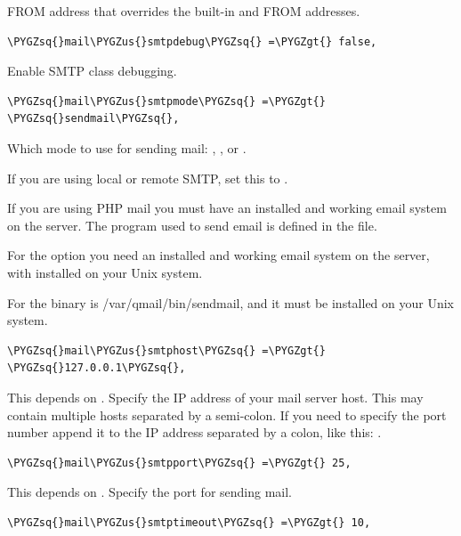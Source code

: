 \documentclass[letterpaper,10pt,english]{sphinxmanual}
\def\PYGZus{\char`\_}
\def\PYGZgt{\char`\>}
\def\PYGZsq{\char`\'}
\renewcommand\PYGZsq{\textquotesingle}
\begin{document}
FROM address that overrides the built-in  and
 FROM addresses.

\begin{Verbatim}[commandchars=\\\{\}]
\PYGZsq{}mail\PYGZus{}smtpdebug\PYGZsq{} =\PYGZgt{} false,
\end{Verbatim}

Enable SMTP class debugging.

\begin{Verbatim}[commandchars=\\\{\}]
\PYGZsq{}mail\PYGZus{}smtpmode\PYGZsq{} =\PYGZgt{} \PYGZsq{}sendmail\PYGZsq{},
\end{Verbatim}

Which mode to use for sending mail: , ,  or
.

If you are using local or remote SMTP, set this to .

If you are using PHP mail you must have an installed and working email system
on the server. The program used to send email is defined in the 
file.

For the  option you need an installed and working email system on
the server, with  installed on your Unix system.

For  the binary is /var/qmail/bin/sendmail, and it must be installed
on your Unix system.

\begin{Verbatim}[commandchars=\\\{\}]
\PYGZsq{}mail\PYGZus{}smtphost\PYGZsq{} =\PYGZgt{} \PYGZsq{}127.0.0.1\PYGZsq{},
\end{Verbatim}

This depends on . Specify the IP address of your mail
server host. This may contain multiple hosts separated by a semi-colon. If
you need to specify the port number append it to the IP address separated by
a colon, like this: .

\begin{Verbatim}[commandchars=\\\{\}]
\PYGZsq{}mail\PYGZus{}smtpport\PYGZsq{} =\PYGZgt{} 25,
\end{Verbatim}

This depends on . Specify the port for sending mail.

\begin{Verbatim}[commandchars=\\\{\}]
\PYGZsq{}mail\PYGZus{}smtptimeout\PYGZsq{} =\PYGZgt{} 10,
\end{Verbatim}
\end{document}

